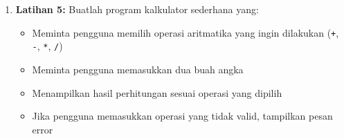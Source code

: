 \begin{enumerate}
\item \textbf{Latihan 5:} Buatlah program kalkulator sederhana yang:
\begin{itemize}
    \item Meminta pengguna memilih operasi aritmatika yang ingin dilakukan (\texttt{+}, \texttt{-}, \texttt{*}, \texttt{/})
    \item Meminta pengguna memasukkan dua buah angka
    \item Menampilkan hasil perhitungan sesuai operasi yang dipilih
    \item Jika pengguna memasukkan operasi yang tidak valid, tampilkan pesan error
\end{itemize}

\end{enumerate}